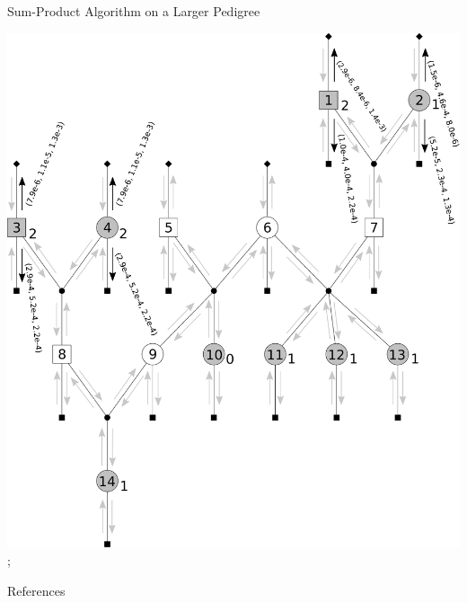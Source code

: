 \documentclass[letter,graphicx]{beamer}
\begin{document}
\begin{frame}{Sum-Product Algorithm on a Larger Pedigree} 
\begin{center} 
\includegraphics[height = 0.8\textheight]{./images/mg-example-step12.pdf}; 
\end{center}
\end{frame}



\begin{frame}{References}
\tiny



\end{frame}
\end{document}
